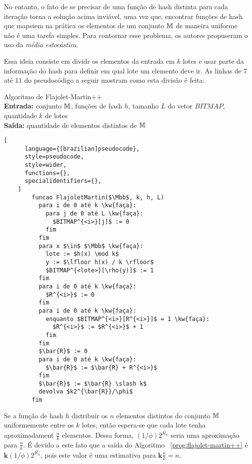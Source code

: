 No entanto, o fato de se precisar de uma função de hash distinta para cada iteração torna a solução acima inviável, 
uma vez que, encontrar funções de hash que mapeiem na prática os elementos de um conjunto $\mathbb{M}$ de maneira
uniforme não é uma tarefa simples. Para contornar esse problema, os autores propuseram o uso da 
\textit{média estocástica}.

Essa ideia consiste em dividr os elementos da entrada em $k$ lotes e usar parte da informação do hash para definir em 
qual lote um elemento deve ir. 
As linhas de $7$ até $11$ do pseudocódigo a seguir mostram como esta divisão é feita:
\begin{programruledcaption}{
  Algoritmo de Flajolet-Martin++
  \\ \textbf{Entrada:} conjunto $\mathbb{M}$, funções de hash $h$, tamanho $L$ do vetor $BITMAP$, 
  quantidade $k$ de lotes
  \\ \textbf{Saída:} quantidade de elementos distintos de $\mathbb{M}$
  \label{prog:flajolet-martin++}
  }
    \begin{lstlisting}[
      language={[brazilian]pseudocode},
      style=pseudocode,
      style=wider,
      functions={},
      specialidentifiers={},
    ]
        funcao FlajoletMartin($\Mbb$, k, h, L)
          para i de 0 até k \kw{faça}:
            para j de 0 até L \kw{faça}:
              $BITMAP^{<i>}[j]$ := 0
            fim
          fim
          para x $\in$ $\Mbb$ \kw{faça}:
            lote := $h(x) \mod k$
            y := $\lfloor h(x) / k \rfloor$
            $BITMAP^{<lote>}[\rho(y)]$ := 1
          fim
          para i de 0 até k \kw{faça}:
            $R^{<i>}$ := 0
          fim
          para i de 0 até k \kw{faça}:
            enquanto $BITMAP^{<i>}[R^{<i>}]$ = 1 \kw{faça}:
              $R^{<i>}$ := $R^{<i>}$ + 1
            fim
          fim
          $\bar{R}$ := 0
          para i de 0 até k \kw{faça}:
            $\bar{R}$ := $\bar{R} + R^{<i>}$ 
          fim
          $\bar{R}$ := $\bar{R} \slash k$
          devolva $k2^{\bar{R}}/\phi$
        fim
    \end{lstlisting}
  \end{programruledcaption}

Se a função de hash $h$ distribuir os $n$ elementos distintos do conjunto $\mathbb{M}$ uniformemente entre os 
$k$ lotes, então espera-se que cada lote tenha aproximadament $\frac{n}{k}$ elementos. Dessa forma, 
$(1 / \phi)2^{\bar{R_n}}$ seria uma aproximação para $\frac{n}{k}$. É devido a este fato que a saída do Algoritmo~
\ref{prog:flajolet-martin++} é $\mathbf{k} (1 / \phi)2^{\bar{R_n}}$, pois este valor é uma estimativa para 
$\mathbf{k} \frac{n}{k} = n$.

